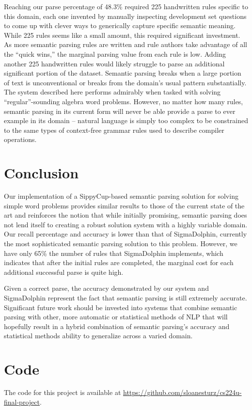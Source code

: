 \documentclass[11pt]{article}
\begin{document}
Reaching our parse percentage of 48.3\% required 225 handwritten rules specific to this domain, each one invented by manually inspecting development set questions to come up with clever ways to generically capture specific semantic meaning. While 225 rules seems like a small amount, this required significant investment. As more semantic parsing rules are written and rule authors take advantage of all the ``quick wins,'' the marginal parsing value from each rule is low. Adding another 225 handwritten rules would likely struggle to parse an additional significant portion of the dataset.
Semantic parsing breaks when a large portion of text is unconventional or breaks from the domain’s usual pattern substantially. The system described here performs admirably when tasked with solving ``regular''-sounding algebra word problems. However, no matter how many rules, semantic parsing in its current form will never be able provide a parse to ever example in its domain -- natural language is simply too complex to be constrained to the same types of context-free grammar rules used to describe compiler operations.


\section{Conclusion}
Our implementation of a SippyCup-based semantic parsing solution for solving simple word problems provides similar results to those of the current state of the art and reinforces the notion that while initially promising, semantic parsing does not lend itself to creating a robust solution system with a highly variable domain. Our recall percentage and accuracy is lower than that of SigmaDolphin, currently the most sophisticated semantic parsing solution to this problem. However, we have only 65\% the number of rules that SigmaDolphin implements, which indicates that after the initial rules are completed, the marginal cost for each additional successful parse is quite high.

Given a correct parse, the accuracy demonstrated by our system and SigmaDolphin represent the fact that semantic parsing is still extremely accurate. Significant future work should be invested into systems that combine semantic parsing with other, more automatic or statistical methods of NLP that will hopefully result in a hybrid combination of semantic parsing’s accuracy and statistical methods ability to generalize across a varied domain.

\section{Code}
The code for this project is available at \url{https://github.com/sloanesturz/cs224u-final-project}.
\end{document}
